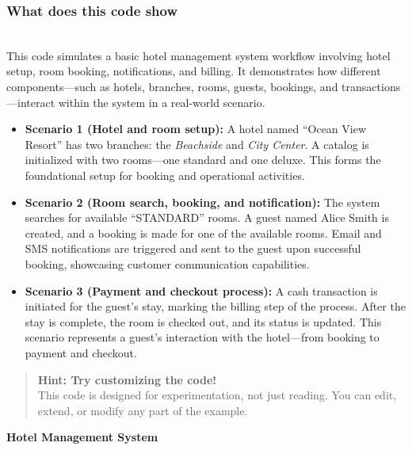 \subsubsection{What does this code show}\label{--bFT1y0UbtMW7RoYpx_K}
\\
This code simulates a basic hotel management system workflow involving hotel setup, room booking, notifications, and billing. It demonstrates how different components---such as hotels, branches, rooms, guests, bookings, and transactions---interact within the system in a real-world scenario.

\begin{itemize}
\item
\protect{}\label{CDd_uwl7OwdgD9u14hBpS}
\textbf{Scenario 1 (Hotel and room setup):} A hotel named ``Ocean View Resort'' has two branches: the \emph{Beachside} and \emph{City Center}. A catalog is initialized with two rooms---one standard and one deluxe. This forms the foundational setup for booking and operational activities.
\item
\protect{}\label{h5XEvKoDpyqrkxucaLXO5}
\textbf{Scenario 2 (Room search, booking, and notification):} The system searches for available ``STANDARD'' rooms. A guest named Alice Smith is created, and a booking is made for one of the available rooms. Email and SMS notifications are triggered and sent to the guest upon successful booking, showcasing customer communication capabilities.
\item
\protect{}\label{g7WsxyZRYs2JIKwSWX-JE}
\textbf{Scenario 3 (Payment and checkout process):} A cash transaction is initiated for the guest's stay, marking the billing step of the process. After the stay is complete, the room is checked out, and its status is updated. This scenario represents a guest's interaction with the hotel---from booking to payment and checkout.
\end{itemize}
\begin{quote}
\textbf{Hint: Try customizing the code!}\\
This code is designed for experimentation, not just reading. You can edit, extend, or modify any part of the example.
\end{quote}

\textbf{Hotel Management System}

